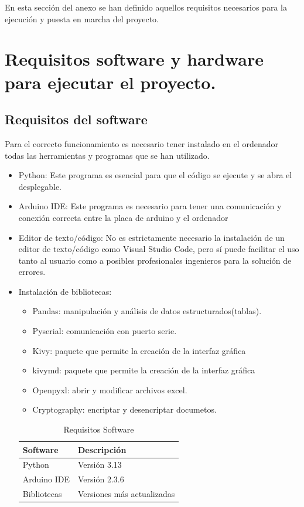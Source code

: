 En esta sección del anexo se han definido aquellos requisitos necesarios para la ejecución y puesta en marcha del proyecto. 
\section{Requisitos software y hardware para ejecutar el proyecto.}
\subsection{Requisitos del software}
Para el correcto funcionamiento es necesario tener instalado en el ordenador todas las herramientas y programas que se han utilizado. 
\begin{itemize}
    \item Python: Este programa es esencial para que el código se ejecute y se abra el desplegable.
    \item Arduino IDE: Este programa es necesario para tener una comunicación y conexión correcta entre la placa de arduino y el ordenador 
    \item Editor de texto/código: No es estrictamente necesario la instalación de un editor de texto/código como Visual Studio Code, pero sí puede facilitar el uso tanto al usuario como a posibles profesionales ingenieros para la solución de errores.
    \item Instalación de bibliotecas:
    \begin{itemize}
        \item Pandas: manipulación y análisis de datos estructurados(tablas).
        \item Pyserial: comunicación con puerto serie.
        \item Kivy: paquete que permite la creación de la interfaz gráfica
        \item kivymd: paquete que permite la creación de la interfaz gráfica
        \item Openpyxl: abrir y modificar archivos excel.
        \item Cryptography: encriptar y desencriptar documetos.
    \end{itemize}

\begin{table}[]
\centering
\begin{tabular}{|l|l|}
\hline
\rowcolor[HTML]{BFBFBF} 
\textbf{Software} & \textbf{Descripción} \\ \hline
Python & Versión 3.13\\ \hline
Arduino IDE & Versión 2.3.6\\ \hline
Bibliotecas & Versiones más actualizadas\\ \hline
\end{tabular}
\caption{Requisitos Software}
\label{tab:Requisitos_Software}
\end{table}
\end{itemize}
